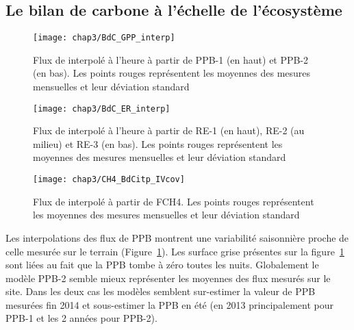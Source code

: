 \subsection{Le bilan de carbone à l'échelle de l'écosystème}


\begin{figure}[!hbt]
\centering
\texttt{[image: chap3/BdC\_GPP\_interp]}
\caption{Flux de \coo interpolé à l'heure à partir de PPB-1 (en haut) et PPB-2 (en bas). Les points rouges représentent les moyennes des mesures mensuelles et leur déviation standard}
\label{fig:BdC_GPP_interp}
\end{figure}

\begin{figure}
\centering
\texttt{[image: chap3/BdC\_ER\_interp]}
\caption{Flux de \coo interpolé à l'heure à partir de RE-1 (en haut), RE-2 (au milieu) et RE-3 (en bas). Les points rouges représentent les moyennes des mesures mensuelles et leur déviation standard}
\label{fig:BdC_ER_interp}
\end{figure}

\begin{figure}
\centering
\texttt{[image: chap3/CH4\_BdCitp\_IVcov]}
\caption{Flux de \coo interpolé à partir de FCH4. Les points rouges représentent les moyennes des mesures mensuelles et leur déviation standard}
\label{fig:BdC_CH4_interp}
\end{figure}



Les interpolations des flux de PPB montrent une variabilité saisonnière proche de celle mesurée sur le terrain (Figure~\ref{fig:BdC_GPP_interp}). 
Les surface grise présentes sur la figure~\ref{fig:BdC_GPP_interp} sont liées au fait que la PPB tombe à zéro toutes les nuits.
Globalement le modèle PPB-2 semble mieux représenter les moyennes des flux mesurés sur le site.
Dans les deux cas les modèles semblent sur-estimer la valeur de PPB mesurées fin 2014 et sous-estimer la PPB en été (en 2013 principalement pour PPB-1 et les 2 années pour PPB-2).

